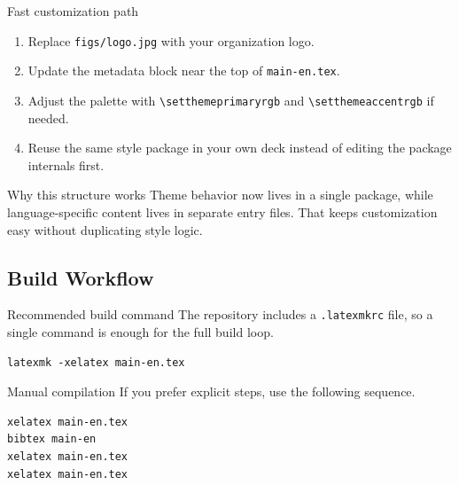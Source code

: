\documentclass[8pt]{beamer}
\begin{document}
\begin{frame}[fragile]{\insertsection}{\insertsubsection}

    \begin{block}{Fast customization path}
        \begin{enumerate}
            \item Replace \lstinline|figs/logo.jpg| with your organization logo.
            \item Update the metadata block near the top of \lstinline|main-en.tex|.
            \item Adjust the palette with \lstinline|\setthemeprimaryrgb| and \lstinline|\setthemeaccentrgb| if needed.
            \item Reuse the same style package in your own deck instead of editing the package internals first.
        \end{enumerate}
    \end{block}

    \begin{callout}{Why this structure works}
        Theme behavior now lives in a single package, while language-specific content lives in separate entry files. That keeps customization easy without duplicating style logic.
    \end{callout}

\end{frame}

\subsection{Build Workflow}

\begin{frame}[fragile]{\insertsection}{\insertsubsection}

    \begin{block}{Recommended build command}
        The repository includes a \lstinline|.latexmkrc| file, so a single command is enough for the full build loop.
        \begin{lstlisting}[style=latex]
latexmk -xelatex main-en.tex
        \end{lstlisting}
    \end{block}

    \begin{block}{Manual compilation}
        If you prefer explicit steps, use the following sequence.
        \begin{lstlisting}[style=latex]
xelatex main-en.tex
bibtex main-en
xelatex main-en.tex
xelatex main-en.tex
        \end{lstlisting}
    \end{block}

\end{frame}
\end{document}
